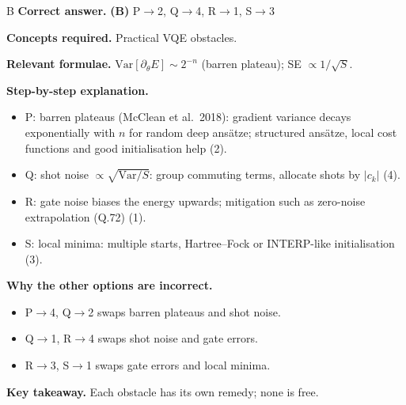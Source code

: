 \documentclass[11pt,a4paper]{article}
\newcommand{\qsep}{\par\vspace{2pt}{\color{black!15}\hrule}\vspace{4pt}}
\begin{document}
\begin{solbox}{B}
\textbf{\color{brand}Correct answer.} \textcolor{okgreen}{\textbf{(B)}} P$\to$2, Q$\to$4, R$\to$1, S$\to$3

\textbf{\color{brand}Concepts required.} Practical VQE obstacles.

\textbf{\color{brand}Relevant formulae.} $\mathrm{Var}[\partial_\theta E] \sim 2^{-n}$ (barren plateau); SE $\propto 1/\sqrt S$.

\textbf{\color{brand}Step-by-step explanation.} \begin{itemize}\itemsep0pt
\item P: barren plateaus (McClean et al.\ 2018): gradient variance decays exponentially with $n$ for random deep ansätze; structured ansätze, local cost
functions and good initialisation help (2).
\item Q: shot noise $\propto \sqrt{\mathrm{Var}/S}$: group commuting terms, allocate shots by $|c_k|$ (4).
\item R: gate noise biases the energy upwards; mitigation such as zero-noise extrapolation (Q.72) (1).
\item S: local minima: multiple starts, Hartree--Fock or INTERP-like initialisation (3).
\end{itemize}

\textbf{\color{brand}Why the other options are incorrect.}
\begin{itemize}[leftmargin=2.4em, itemsep=1pt, topsep=2pt]
\item[\textbf{(A)}] P$\to$4, Q$\to$2 swaps barren plateaus and shot noise.
\item[\textbf{(C)}] Q$\to$1, R$\to$4 swaps shot noise and gate errors.
\item[\textbf{(D)}] R$\to$3, S$\to$1 swaps gate errors and local minima.
\end{itemize}
\textbf{\color{brand}Key takeaway.} Each obstacle has its own remedy; none is free.
\end{solbox}
\qsep
\end{document}
